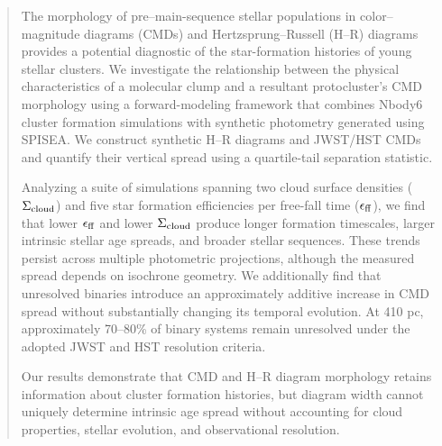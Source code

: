 \documentclass[linenumbers, twocolumn]{aastex631}
\begin{document}
\begin{abstract}
The morphology of pre--main-sequence stellar populations in color--magnitude diagrams (CMDs) and Hertzsprung--Russell (H--R) diagrams provides a potential diagnostic of the star-formation histories of young stellar clusters. We investigate the relationship between the physical characteristics of a molecular clump and a resultant protocluster's CMD morphology using a forward-modeling framework that combines Nbody6 cluster formation simulations with synthetic photometry generated using SPISEA. We construct synthetic H--R diagrams and JWST/HST CMDs and quantify their vertical spread using a quartile-tail separation statistic.

Analyzing a suite of simulations spanning two cloud surface densities ($\Sigma_{\rm cloud}$) and five star formation efficiencies per free-fall time ($\epsilon_{\rm ff}$), we find that lower $\epsilon_{\rm ff}$ and lower $\Sigma_{\rm cloud}$ produce longer formation timescales, larger intrinsic stellar age spreads, and broader stellar sequences. These trends persist across multiple photometric projections, although the measured spread depends on isochrone geometry. 
We additionally find that unresolved binaries introduce an approximately additive increase in CMD spread without substantially changing its
temporal evolution. At 410 pc, approximately 70--80\% of binary systems remain unresolved under the adopted JWST and HST resolution criteria.

Our results demonstrate that CMD and H--R diagram morphology retains information about cluster formation histories, but diagram width cannot uniquely determine intrinsic age spread without accounting for cloud properties, stellar evolution, and observational resolution.

\end{abstract}

\end{document}
